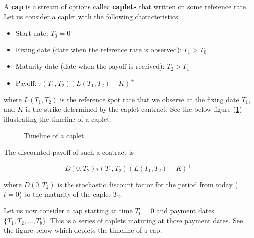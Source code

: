 \documentclass[titlepage, 12pt]{article}
\begin{document}
	A \textbf{cap} is a stream of options called \textbf{caplets} that written on some reference rate. Let us consider a caplet with the following characteristics:
	\begin{itemize}
		\item Start date: $T_0=0$
		\item Fixing date (date when the reference rate is observed): $T_1>T_0$
		\item Maturity date (date when the payoff is received): $T_2> T_1$
		\item Payoff: $\tau(T_1,T_2)(L(T_1,T_2)-K)^+$
	\end{itemize}
	
	where $L(T_1,T_2)$ is the reference spot rate that we observe at the fixing date $T_1$, and $K$ is the strike determined by the caplet contract. See the below figure (\ref{fig:caplet}) illustrating the timeline of a caplet:
	\begin{figure}[h!]\label{fig:caplet}
		\begin{center}
		\end{center}
		\caption{Timeline of a caplet}
	\end{figure}
	
	The discounted payoff of such a contract is
	
	$$D(0,T_2)\tau(T_1,T_2)(L(T_1,T_2)-K)^+$$
	
	where $D(0,T_2)$ is the stochastic discount factor for the period from today ($t=0$) to the maturity of the caplet $T_2$.
	
	Let us now consider a cap starting at time $T_0=0$ and payment dates $\{T_1, T_2,...,T_b\}$. This is a series of caplets maturing at those payment dates. See the figure below which depicts the timeline of a cap:
	\begin{center}
	\end{center}
	
\end{document}
